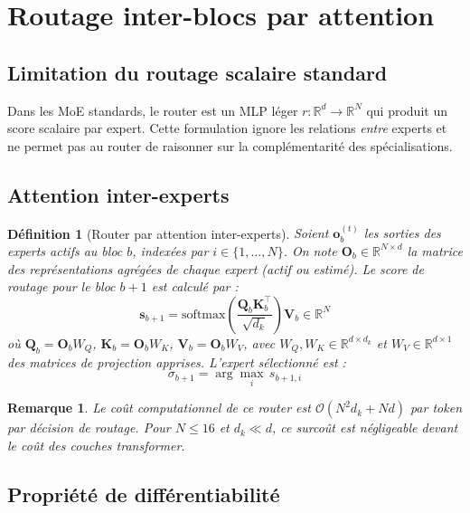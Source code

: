 \documentclass[10pt,a4paper]{article}
\newtheorem{definition}{Définition}
\newtheorem{remark}{Remarque}
\begin{document}
\section{Routage inter-blocs par attention}

\subsection{Limitation du routage scalaire standard}

Dans les MoE standards, le router est un MLP léger $r : \mathbb{R}^d \to \mathbb{R}^N$ qui produit un score scalaire par expert. Cette formulation ignore les relations \textit{entre} experts et ne permet pas au router de raisonner sur la complémentarité des spécialisations.

\subsection{Attention inter-experts}

\begin{definition}[Router par attention inter-experts]
Soient $\mathbf{o}_b^{(t)}$ les sorties des experts actifs au bloc $b$, indexées par $i \in \{1,\ldots,N\}$. On note $\mathbf{O}_b \in \mathbb{R}^{N \times d}$ la matrice des représentations agrégées de chaque expert (actif ou estimé). Le score de routage pour le bloc $b+1$ est calculé par :
\begin{equation}
  \mathbf{s}_{b+1} = \text{softmax}\!\left(\frac{\mathbf{Q}_b \mathbf{K}_b^\top}{\sqrt{d_k}}\right)\mathbf{V}_b \in \mathbb{R}^{N}
\end{equation}
où $\mathbf{Q}_b = \mathbf{O}_b W_Q$, $\mathbf{K}_b = \mathbf{O}_b W_K$, $\mathbf{V}_b = \mathbf{O}_b W_V$, avec $W_Q, W_K \in \mathbb{R}^{d \times d_k}$ et $W_V \in \mathbb{R}^{d \times 1}$ des matrices de projection apprises. L'expert sélectionné est :
\begin{equation}
  \sigma_{b+1} = \arg\max_{i}\, s_{b+1,i}
\end{equation}
\end{definition}

\begin{remark}
Le coût computationnel de ce router est $\mathcal{O}(N^2 d_k + N d)$ par token par décision de routage. Pour $N \leq 16$ et $d_k \ll d$, ce surcoût est négligeable devant le coût des couches transformer.
\end{remark}

\subsection{Propriété de différentiabilité}
\end{document}
